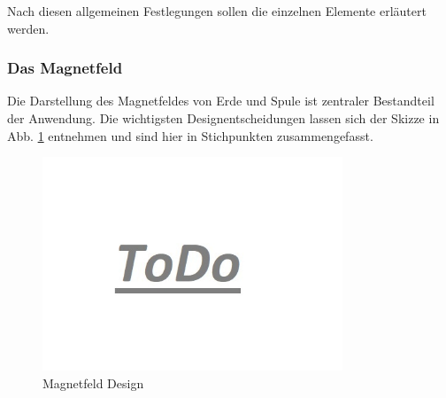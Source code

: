Nach diesen allgemeinen Festlegungen sollen die einzelnen Elemente erläutert werden.\\

\subsubsection{Das Magnetfeld} %
Die Darstellung des Magnetfeldes von Erde und Spule ist zentraler Bestandteil der Anwendung. Die wichtigsten Designentscheidungen lassen sich der Skizze in Abb. \ref{img:magnetic-design} entnehmen und sind hier in Stichpunkten zusammengefasst.

\begin{figure}[h!]
	\centering
	\includegraphics[width=0.8\textwidth]{images/todo.jpg}
	\caption{Magnetfeld Design}
	\label{img:magnetic-design}
\end{figure}

